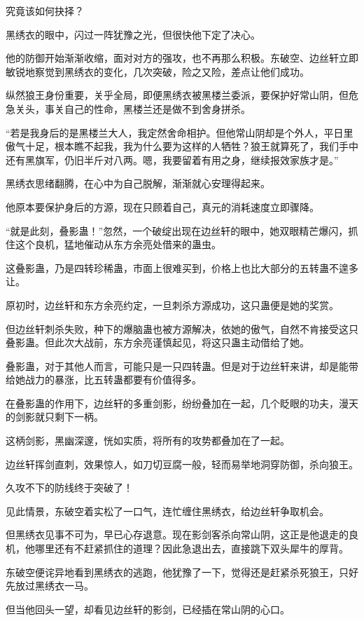 \begin{this_body}
究竟该如何抉择？

黑绣衣的眼中，闪过一阵犹豫之光，但很快他下定了决心。

他的防御开始渐渐收缩，面对对方的强攻，也不再那么积极。东破空、边丝轩立即敏锐地察觉到黑绣衣的变化，几次突破，险之又险，差点让他们成功。

纵然狼王身份重要，关乎全局，即便黑绣衣被黑楼兰委派，要保护好常山阴，但危急关头，事关自己的性命，黑楼兰还是做不到舍身拼杀。

“若是我身后的是黑楼兰大人，我定然舍命相护。但他常山阴却是个外人，平日里傲气十足，根本瞧不起我，我为什么要为这样的人牺牲？狼王就算死了，我们手中还有黑旗军，仍旧半斤对八两。嗯，我要留着有用之身，继续报效家族才是。”

黑绣衣思绪翻腾，在心中为自己脱解，渐渐就心安理得起来。

他原本要保护身后的方源，现在只顾着自己，真元的消耗速度立即骤降。

“就是此刻，叠影蛊！”忽然，一个破绽出现在边丝轩的眼中，她双眼精芒爆闪，抓住这个良机，猛地催动从东方余亮处借来的蛊虫。

这叠影蛊，乃是四转珍稀蛊，市面上很难买到，价格上也比大部分的五转蛊不遑多让。

原初时，边丝轩和东方余亮约定，一旦刺杀方源成功，这只蛊便是她的奖赏。

但边丝轩刺杀失败，种下的爆脑蛊也被方源解决，依她的傲气，自然不肯接受这只叠影蛊。但此次大战前，东方余亮谨慎起见，将这只蛊主动借给了她。

叠影蛊，对于其他人而言，可能只是一只四转蛊。但是对于边丝轩来讲，却是能带给她战力的暴涨，比五转蛊都要有价值得多。

在叠影蛊的作用下，边丝轩的多重剑影，纷纷叠加在一起，几个眨眼的功夫，漫天的剑影就只剩下一柄。

这柄剑影，黑幽深邃，恍如实质，将所有的攻势都叠加在了一起。

边丝轩挥剑直刺，效果惊人，如刀切豆腐一般，轻而易举地洞穿防御，杀向狼王。

久攻不下的防线终于突破了！

见此情景，东破空着实松了一口气，连忙缠住黑绣衣，给边丝轩争取机会。

但黑绣衣见事不可为，早已心存退意。现在影剑客杀向常山阴，这正是他退走的良机，他哪里还有不赶紧抓住的道理？因此急退出去，直接跳下双头犀牛的厚背。

东破空便诧异地看到黑绣衣的逃跑，他犹豫了一下，觉得还是赶紧杀死狼王，只好先放过黑绣衣一马。

但当他回头一望，却看见边丝轩的影剑，已经插在常山阴的心口。


\end{this_body}
